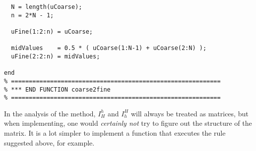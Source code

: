 \begin{example}[Multigrid]
\begin{lstlisting}
  N = length(uCoarse);
  n = 2*N - 1;

  uFine(1:2:n) = uCoarse;

  midValues    = 0.5 * ( uCoarse(1:N-1) + uCoarse(2:N) );
  uFine(2:2:n) = midValues;

end
% ===========================================================
% *** END FUNCTION coarse2fine
% ===========================================================
\end{lstlisting}


In the analysis of the method, $I_H^h$ and $I_h^H$ will always be treated as
matrices, but when implementing, one would \emph{certainly not} try to figure
out the structure of the matrix. It is a lot simpler to implement a function
that executes the rule suggested above, for example.
\end{example}
